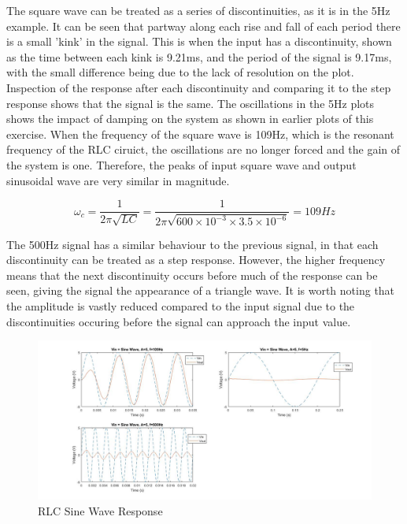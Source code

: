 \documentclass[11pt, oneside, titlepage]{article}   	%
\begin{document}
The square wave can be treated as a series of discontinuities, as it is in the 5Hz example. It can be seen that partway along each rise and fall of each period there is a small 'kink' in the signal. This is when the input has a discontinuity, shown as the time between each kink is 9.21ms, and the period of the signal is 9.17ms, with the small difference being due to the lack of resolution on the plot. Inspection of the response after each discontinuity and comparing it to the step response shows that the signal is the same. The oscillations in the 5Hz plots shows the impact of damping on the system as shown in earlier plots of this exercise. When the frequency of the square wave is 109Hz, which is the resonant frequency of the RLC ciruict, the oscillations are no longer forced and the gain of the system is one. Therefore, the peaks of input square wave and output sinusoidal wave are very similar in magnitude.

\begin{equation}
\omega_c = \frac{1}{2\pi \sqrt{LC}} = \frac{1}{2\pi \sqrt{600\times10^{-3}\times3.5\times10^{-6}}} = 109Hz
\end{equation}

The  500Hz signal has a similar behaviour to the previous signal, in that each discontinuity can be treated as a step response. However, the higher frequency means that the next discontinuity occurs before much of the response can be seen, giving the signal the appearance of a triangle wave. It is worth noting that the amplitude is vastly reduced compared to the input signal due to the discontinuities occuring before the signal can approach the input value.

\begin{figure}[H]
\center
\includegraphics[scale = 0.35]{exercise3_7}
\caption{RLC Sine Wave Response} \label{fig:ex3_7}
\end{figure}
\end{document}
